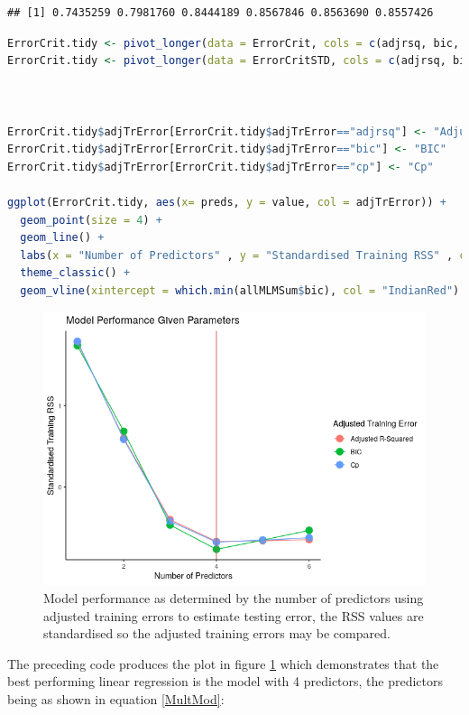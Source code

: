 \documentclass[
]{article}
\begin{document}
\begin{lstlisting}
## [1] 0.7435259 0.7981760 0.8444189 0.8567846 0.8563690 0.8557426
\end{lstlisting}

\begin{lstlisting}[language=R]
ErrorCrit.tidy <- pivot_longer(data = ErrorCrit, cols = c(adjrsq, bic, cp), names_to = "adjTrError")
ErrorCrit.tidy <- pivot_longer(data = ErrorCritSTD, cols = c(adjrsq, bic, cp), names_to = "adjTrError")



ErrorCrit.tidy$adjTrError[ErrorCrit.tidy$adjTrError=="adjrsq"] <- "Adjusted R-Squared"
ErrorCrit.tidy$adjTrError[ErrorCrit.tidy$adjTrError=="bic"] <- "BIC"
ErrorCrit.tidy$adjTrError[ErrorCrit.tidy$adjTrError=="cp"] <- "Cp"

ggplot(ErrorCrit.tidy, aes(x= preds, y = value, col = adjTrError)) + 
  geom_point(size = 4) +
  geom_line() + 
  labs(x = "Number of Predictors" , y = "Standardised Training RSS" , col = "Adjusted Training Error", title = "Model Performance Given Parameters") +
  theme_classic() +
  geom_vline(xintercept = which.min(allMLMSum$bic), col = "IndianRed")
\end{lstlisting}



\begin{figure}
	\centering
	\includegraphics[width=0.7\linewidth]{SecAssignment_files/figure-html/unnamed-chunk-13-1.png}
	\caption{Model performance as determined by the number of predictors using adjusted training errors to estimate testing error, the RSS values are standardised so the adjusted training errors may be compared.}
	\label{bestsubsetError}
\end{figure}



The preceding code produces the plot in figure \ref{bestsubsetError} which demonstrates that the best performing linear regression is the
model with 4 predictors, the predictors being as shown in equation \eqref{MultMod}:
\end{document}
